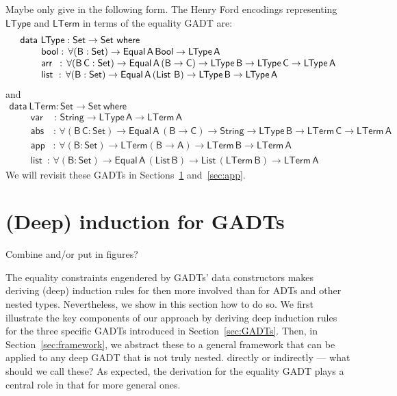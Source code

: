 \documentclass[9pt]{entcs}
\begin{document}
{\color{red} Maybe only give in the following form.}
The Henry Ford encodings representing $\mathsf{LType}$ and
$\mathsf{LTerm}$ in terms of the equality GADT are:
\begin{equation}\label{eq:eq_ltype}
\begin{array}{l}
\mathsf{data\ LType : Set \to Set\ where}\\
\mathsf{\;\;\;\;\;\;\;\;bool :\, \forall (B : Set) \to Equal\,A\,Bool
  \to LType\,A}\\ 
\mathsf{\;\;\;\;\;\;\;\;arr\,\,\, :\, \forall (B\,C : Set) \to
  Equal\,A\,(B \to C) \to LType\,B \to LType\,C \to LType\,A}\\ 
  \mathsf{\;\;\;\;\;\;\;\;list\,\, :\, \forall (B : Set) \to
    Equal\,A\,(\mathsf{List}\,\,B) \to LType\,B \to LType\,A} 
\end{array}
\end{equation}
and
\begin{equation}\label{eq:eq_lterm}
\begin{array}{l}
\mathsf{data\ LTerm : Set \to Set\ where}\\
\mathsf{\;\;\;\;\;\;\;\;var\,\,\,\,\,\,\,:\, String \to LType\,A \to
  LTerm\,A} \\  
\mathsf{\;\;\;\;\;\;\;\;abs\,\,\,\,\,\, :\, \forall (B\,C : Set) \to
  Equal\,A\,(B \to C) \to String \to LType\,B \to LTerm\,C \to
  LTerm\,A}\\ 
  \mathsf{\;\;\;\;\;\;\;\;app\,\,\,\,\, :\, \forall (B : Set) \to
    LTerm (B \to A) \to LTerm\,B \to LTerm\,A} \\ 
  \mathsf{\;\;\;\;\;\;\;\;list\,\,\, :\, \forall (B : Set) \to
    Equal\,A\,(List\,B) \to List\,(LTerm\,B) \to LTerm\,A} 
\end{array}
\end{equation}
We will revisit these GADTs in Sections~\ref{sec:deep-ind-GADTs}
and~\ref{sec:app}.

\section{(Deep) induction for GADTs}\label{sec:deep-ind-GADTs}

{\color{red} Combine and/or put in figures?}

The equality constraints engendered by GADTs' data constructors makes
deriving (deep) induction rules for then more involved than for ADTs
and other nested types. Nevertheless, we show in this section how to
do so. We first illustrate the key components of our approach by
deriving deep induction rules for the three specific GADTs introduced
in Section~\ref{sec:GADTs}. Then, in Section~\ref{sec:framework}, we
abstract these to a general framework that can be applied to any deep
GADT that is not truly nested. {\color{red} directly or indirectly ---
  what should we call these?} As expected, the derivation for the
equality GADT plays a central role in that for more general ones.
\end{document}
